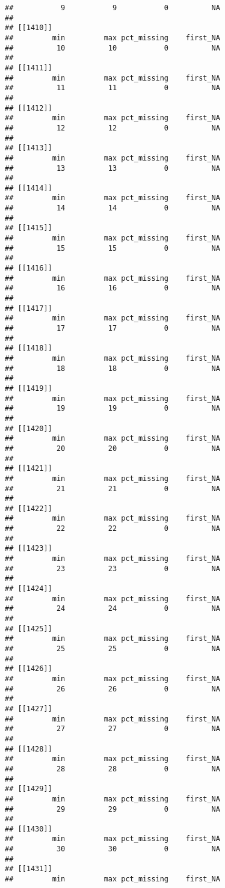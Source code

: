 \documentclass[
]{article}
\begin{document}
\begin{verbatim}
##           9           9           0          NA 
## 
## [[1410]]
##         min         max pct_missing    first_NA 
##          10          10           0          NA 
## 
## [[1411]]
##         min         max pct_missing    first_NA 
##          11          11           0          NA 
## 
## [[1412]]
##         min         max pct_missing    first_NA 
##          12          12           0          NA 
## 
## [[1413]]
##         min         max pct_missing    first_NA 
##          13          13           0          NA 
## 
## [[1414]]
##         min         max pct_missing    first_NA 
##          14          14           0          NA 
## 
## [[1415]]
##         min         max pct_missing    first_NA 
##          15          15           0          NA 
## 
## [[1416]]
##         min         max pct_missing    first_NA 
##          16          16           0          NA 
## 
## [[1417]]
##         min         max pct_missing    first_NA 
##          17          17           0          NA 
## 
## [[1418]]
##         min         max pct_missing    first_NA 
##          18          18           0          NA 
## 
## [[1419]]
##         min         max pct_missing    first_NA 
##          19          19           0          NA 
## 
## [[1420]]
##         min         max pct_missing    first_NA 
##          20          20           0          NA 
## 
## [[1421]]
##         min         max pct_missing    first_NA 
##          21          21           0          NA 
## 
## [[1422]]
##         min         max pct_missing    first_NA 
##          22          22           0          NA 
## 
## [[1423]]
##         min         max pct_missing    first_NA 
##          23          23           0          NA 
## 
## [[1424]]
##         min         max pct_missing    first_NA 
##          24          24           0          NA 
## 
## [[1425]]
##         min         max pct_missing    first_NA 
##          25          25           0          NA 
## 
## [[1426]]
##         min         max pct_missing    first_NA 
##          26          26           0          NA 
## 
## [[1427]]
##         min         max pct_missing    first_NA 
##          27          27           0          NA 
## 
## [[1428]]
##         min         max pct_missing    first_NA 
##          28          28           0          NA 
## 
## [[1429]]
##         min         max pct_missing    first_NA 
##          29          29           0          NA 
## 
## [[1430]]
##         min         max pct_missing    first_NA 
##          30          30           0          NA 
## 
## [[1431]]
##         min         max pct_missing    first_NA 

\end{verbatim}
\end{document}
